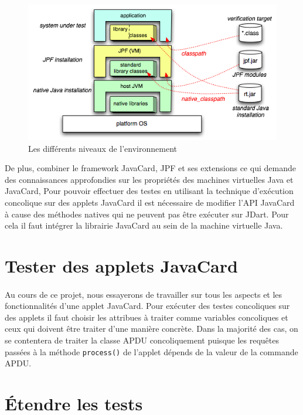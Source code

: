 			\begin{figure}[H]
				\centering
					\includegraphics[scale=0.5]{images/layersJDart.png}
				\caption{\label{fig:jdart_layers} Les différents niveaux de l'environnement }
			\end{figure}
			
			De plus, combiner le framework JavaCard, \gls{JPF} et ses extensions ce qui demande des connaissances approfondies sur les propriétés des machines virtuelles
			Java et JavaCard, Pour pouvoir effectuer des testes en utilisant la technique d'exécution concolique sur des applets JavaCard
			il est nécessaire de modifier l'API JavaCard à cause des méthodes natives qui ne peuvent pas être exécuter sur JDart.
			Pour cela il faut intégrer la librairie JavaCard au sein de la machine virtuelle Java.
			
	\section{Tester des applets JavaCard}
		\paragraph{}
			Au cours de ce projet, nous essayerons de travailler sur tous les aspects et les fonctionnalités d'une applet JavaCard.
			Pour exécuter des testes concoliques sur des applets il faut choisir les attribues à traiter comme variables concoliques et ceux
			qui doivent être traiter d'une manière concrète.
			Dans la majorité des cas, on se contentera de traiter la classe APDU concoliquement puisque les requêtes passées à la méthode \verb|process()|
			de l'applet dépends de la valeur de la commande APDU.
	\section{Étendre les tests}
